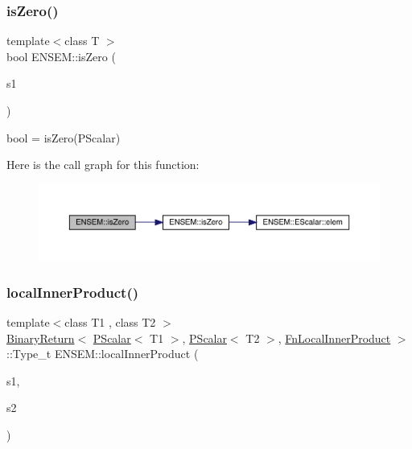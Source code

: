 \subsubsection{\texorpdfstring{isZero()}{isZero()}}
{\footnotesize\ttfamily template$<$class T $>$ \\
bool E\+N\+S\+E\+M\+::is\+Zero (\begin{DoxyParamCaption}\item[{const \mbox{\hyperlink{classENSEM_1_1PScalar}{P\+Scalar}}$<$ T $>$ \&}]{s1 }\end{DoxyParamCaption})}



bool = is\+Zero(\+P\+Scalar) 

Here is the call graph for this function\+:\nopagebreak
\begin{figure}[H]
\begin{center}
\leavevmode
\includegraphics[width=350pt]{db/dcc/group__primscalar_gab10f703e7498f1638c401a92ca8bc947_cgraph}
\end{center}
\end{figure}
\mbox{\label{group__primscalar_ga1190a8f3bd7590e615a59825ca33f2b6}} 
\subsubsection{\texorpdfstring{localInnerProduct()}{localInnerProduct()}}
{\footnotesize\ttfamily template$<$class T1 , class T2 $>$ \\
\mbox{\hyperlink{structENSEM_1_1BinaryReturn}{Binary\+Return}}$<$ \mbox{\hyperlink{classENSEM_1_1PScalar}{P\+Scalar}}$<$ T1 $>$, \mbox{\hyperlink{classENSEM_1_1PScalar}{P\+Scalar}}$<$ T2 $>$, \mbox{\hyperlink{structENSEM_1_1FnLocalInnerProduct}{Fn\+Local\+Inner\+Product}} $>$\+::Type\+\_\+t E\+N\+S\+E\+M\+::local\+Inner\+Product (\begin{DoxyParamCaption}\item[{const \mbox{\hyperlink{classENSEM_1_1PScalar}{P\+Scalar}}$<$ T1 $>$ \&}]{s1,  }\item[{const \mbox{\hyperlink{classENSEM_1_1PScalar}{P\+Scalar}}$<$ T2 $>$ \&}]{s2 }\end{DoxyParamCaption})\hspace{0.3cm}{\ttfamily [inline]}}

